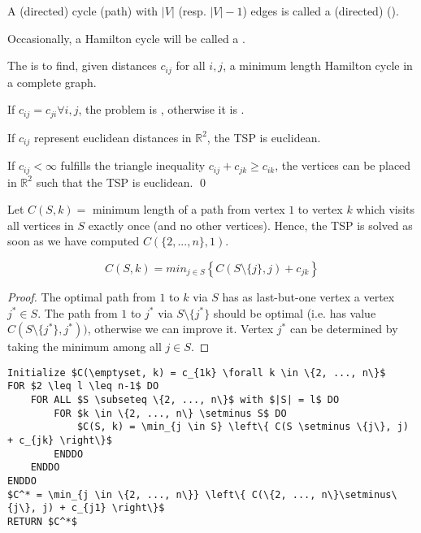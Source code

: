 \begin{lec}[2011-11-25]\end{lec}


\begin{defn}
A (directed) cycle (path) with $|V|$ (resp. $|V|-1$) edges is called a
(directed)  ().

Occasionally, a Hamilton cycle will be called a .

The  is
to find, given distances $c_{ij}$ for all $i, j$, a minimum length Hamilton
cycle in a complete graph.

If $c_{ij} = c_{ji} \forall i,j$, the problem is
, otherwise it is
.

If $c_{ij}$ represent euclidean distances in $\mathbb{R}^2$, the TSP is
euclidean.
\end{defn}

\begin{lem}\label{lem:13.2}
If $c_{ij} < \infty$ fulfills the triangle inequality $c_{ij} + c_{jk} \geq
c_{ik}$, the vertices can be placed in $\mathbb{R}^2$ such that the TSP is
euclidean.
\qed
\end{lem}

Let $C(S, k) =$ minimum length of a path from vertex $1$ to vertex $k$ which
visits all vertices in $S$ exactly once (and no other vertices).
Hence, the TSP is solved as soon as we have computed $C(\{2, ..., n\}, 1)$.

\begin{lem}
\[
C(S, k) = min_{j \in S} \left\{ C(S \setminus \{j\}, j) + c_{jk} \right\}
\]
\end{lem}
\begin{proof}
The optimal path from $1$ to $k$ via $S$ has as last-but-one vertex a vertex
$j^* \in S$. The path from $1$ to $j^*$ via $S \setminus \{j^*\}$ should be
optimal (i.e. has value $C(S \setminus \{j^*\}, j^*))$, otherwise we can
improve it. Vertex $j^*$ can be determined by taking the minimum among all
$j \in S$.
\end{proof}

\begin{lstlisting}[caption=Held-Karp Algorithm for TSP]
Initialize $C(\emptyset, k) = c_{1k} \forall k \in \{2, ..., n\}$
FOR $2 \leq l \leq n-1$ DO
	FOR ALL $S \subseteq \{2, ..., n\}$ with $|S| = l$ DO
		FOR $k \in \{2, ..., n\} \setminus S$ DO
			$C(S, k) = \min_{j \in S} \left\{ C(S \setminus \{j\}, j) + c_{jk} \right\}$
		ENDDO
	ENDDO
ENDDO
$C^* = \min_{j \in \{2, ..., n\}} \left\{ C(\{2, ..., n\}\setminus\{j\}, j) + c_{j1} \right\}$
RETURN $C^*$
\end{lstlisting}

